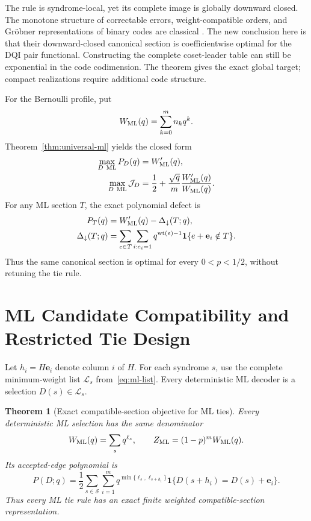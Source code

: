 \documentclass[journal]{IEEEtran}
\newtheorem{theorem}{Theorem}
\theoremstyle{definition}
\theoremstyle{remark}
\newcommand{\ind}{\mathbf 1}
\newcommand{\wt}{\operatorname{wt}}
\begin{document}
The rule is syndrome-local, yet its complete image is globally downward
closed.  The monotone structure of correctable errors, weight-compatible
orders, and Gr\"obner representations of binary codes are classical
\cite{helleseth2005,yasunaga2010,borges2010coset,borges2012leaders}.  The new
conclusion here is that
their downward-closed canonical section is coefficientwise optimal for the
DQI pair functional.  Constructing the complete coset-leader table can still
be exponential in the code codimension.  The theorem gives the exact global
target; compact realizations require additional code structure.

For the Bernoulli profile, put
\begin{equation}
 W_{\rm ML}(q)=\sum_{k=0}^m n_kq^k.
 \label{eq:ml-weight-enumerator}
\end{equation}
Theorem~\ref{thm:universal-ml} yields the closed form
\begin{align}
 \max_{D\ {\rm ML}}P_D(q)&=W'_{\rm ML}(q),
 \label{eq:ml-P-opt}\\
 \max_{D\ {\rm ML}}\mathcal J_D
 &=\frac12+\frac{\sqrt q}{m}
   \frac{W'_{\rm ML}(q)}{W_{\rm ML}(q)}.
 \label{eq:ml-J-opt}
\end{align}
For any ML section $T$, the exact polynomial defect is
\begin{align}
 P_T(q)&=W'_{\rm ML}(q)-\Delta_\downarrow(T;q),
 \label{eq:down-defect}\\
 \Delta_\downarrow(T;q)
 &=\sum_{e\in T}\sum_{i:e_i=1}q^{\wt(e)-1}
   \ind\{e+\mathbf e_i\notin T\}.
 \label{eq:down-defect-def}
\end{align}
Thus the same canonical section is optimal for every $0<p<1/2$, without
retuning the tie rule.

\section{ML Candidate Compatibility and Restricted Tie Design}
\label{sec:general-ml}

Let $h_i=H\mathbf e_i$ denote column $i$ of $H$.  For each syndrome $s$, use the
complete minimum-weight list $\mathcal L_s$ from~\eqref{eq:ml-list}.
Every deterministic ML decoder is a selection $D(s)\in\mathcal L_s$.

\begin{theorem}[Exact compatible-section objective for ML ties]
\label{thm:general-maximum-section}
Every deterministic ML selection has the same denominator
\begin{equation}
 W_{\rm ML}(q)=\sum_s q^{\ell_s},\qquad
 Z_{\rm ML}=(1-p)^mW_{\rm ML}(q).
 \label{eq:ml-denominator}
\end{equation}
Its accepted-edge polynomial is
\begin{equation}
 P(D;q)=\frac12\sum_{s\in\mathcal S}\sum_{i=1}^m
 q^{\min\{\ell_s,\ell_{s+h_i}\}}
 \ind\{D(s+h_i)=D(s)+\mathbf e_i\}.
 \label{eq:general-max-section}
\end{equation}
Thus every ML tie rule has an exact finite weighted compatible-section
representation.
\end{theorem}
\end{document}
